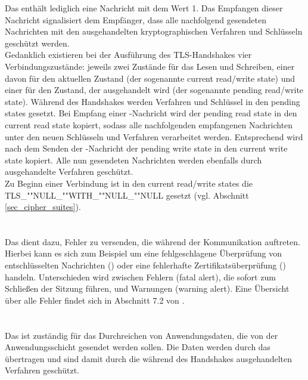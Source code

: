 Das \changecipherspecprotocol{} enthält lediglich eine Nachricht mit dem Wert 1. Das Empfangen dieser Nachricht signalisiert dem Empfänger, dass alle nachfolgend gesendeten Nachrichten mit den ausgehandelten kryptographischen Verfahren und Schlüsseln geschützt werden.\\
Gedanklich existieren bei der Ausführung des TLS-Handshakes vier Verbindungszustände: jeweils zwei Zustände für das Lesen und Schreiben, einer davon für den aktuellen Zustand (der sogenannte current read/write state) und einer für den Zustand, der ausgehandelt wird (der sogenannte pending read/write state). Während des Handshakes werden Verfahren und Schlüssel in den pending states gesetzt. Bei Empfang einer \changecipherspec{}-Nachricht wird der pending read state in den current read state kopiert, sodass alle nachfolgenden empfangenen Nachrichten unter den neuen Schlüsseln und Verfahren verarbeitet werden. Entsprechend wird nach dem Senden der \changecipherspec{}-Nachricht der pending write state in den current write state kopiert. Alle nun gesendeten Nachrichten werden ebenfalls durch ausgehandelte Verfahren geschützt.\\
Zu Beginn einer Verbindung ist in den current read/write states die \ciphersuite{} TLS\_""NULL\_""WITH\_""NULL\_""NULL gesetzt (vgl. Abschnitt \ref{sec_cipher_suites}).

\section{\alertprotocol{}}

Das \alertprotocol{} dient dazu, Fehler zu versenden, die während der Kommunikation auftreten. Hierbei kann es sich zum Beispiel um eine fehlgeschlagene Überprüfung von entschlüsselten Nachrichten (\badrecordmac{}) oder eine fehlerhafte Zertifikatsüberprüfung (\badcertificate{}) handeln. Unterschieden wird zwischen Fehlern (fatal alert), die sofort zum Schließen der Sitzung führen, und Warnungen (warning alert). Eine Übersicht über alle Fehler findet sich in Abschnitt 7.2 von \cite{tls12}.

\section{\applicationdataprotocol{}}

Das \applicationdataprotocol{} ist zuständig für das Durchreichen von Anwendungsdaten, die von der Anwendungsschicht gesendet werden sollen. Die Daten werden durch das \recordprotocol{} übertragen und sind damit durch die während des Handshakes ausgehandelten Verfahren geschützt.

